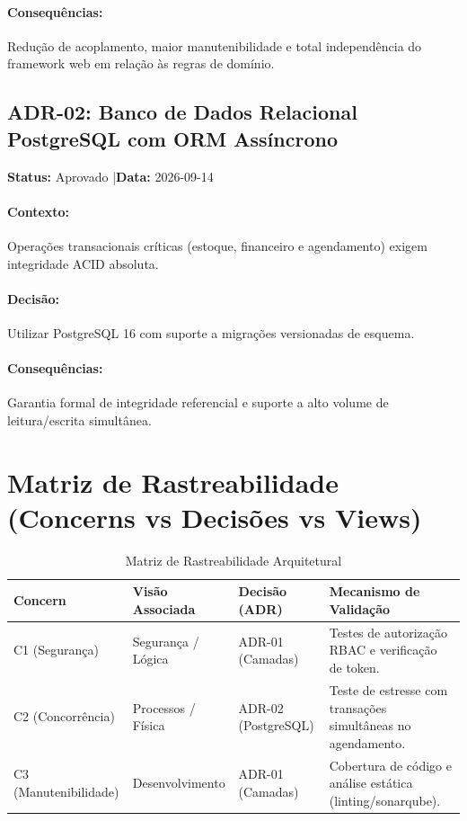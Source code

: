 \paragraph{Consequências:} Redução de acoplamento, maior manutenibilidade e total independência do framework web em relação às regras de domínio.

\subsection{ADR-02: Banco de Dados Relacional PostgreSQL com ORM Assíncrono}
\textbf{Status:} Aprovado \quad|\quad \textbf{Data:} 2026-09-14

\paragraph{Contexto:} Operações transacionais críticas (estoque, financeiro e agendamento) exigem integridade ACID absoluta.
\paragraph{Decisão:} Utilizar PostgreSQL 16 com suporte a migrações versionadas de esquema.
\paragraph{Consequências:} Garantia formal de integridade referencial e suporte a alto volume de leitura/escrita simultânea.

\section{Matriz de Rastreabilidade (Concerns vs Decisões vs Views)}
\begin{table}[htbp]
\caption{Matriz de Rastreabilidade Arquitetural}
\label{tab:rastreabilidade_arquitetura}
\centering
\small
\begin{tabularx}{\textwidth}{@{} l l l Y @{}}
\toprule
\textbf{Concern} & \textbf{Visão Associada} & \textbf{Decisão (ADR)} & \textbf{Mecanismo de Validação} \\
\midrule
C1 (Segurança) & Segurança / Lógica & ADR-01 (Camadas) & Testes de autorização RBAC e verificação de token. \\
C2 (Concorrência) & Processos / Física & ADR-02 (PostgreSQL) & Teste de estresse com transações simultâneas no agendamento. \\
C3 (Manutenibilidade) & Desenvolvimento & ADR-01 (Camadas) & Cobertura de código e análise estática (linting/sonarqube). \\
\bottomrule
\end{tabularx}
\end{table}
